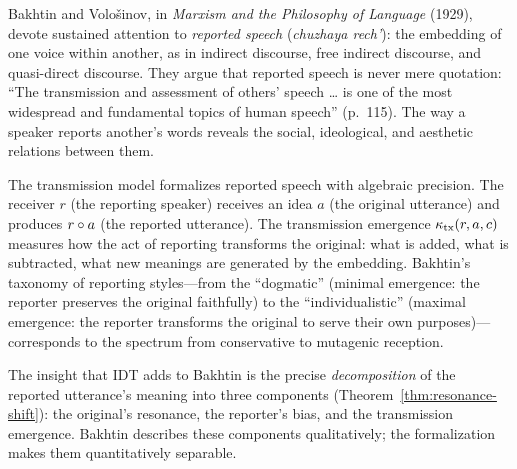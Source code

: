 \begin{interpretation}\label{interp:ch7:bakhtin_reported_speech}
Bakhtin and Volo\v{s}inov, in \emph{Marxism and the Philosophy of
Language} (1929), devote sustained attention to \emph{reported speech}
(\emph{chuzhaya rech'}): the embedding of one voice within another, as in
indirect discourse, free indirect discourse, and quasi-direct discourse.
They argue that reported speech is never mere quotation: ``The
transmission and assessment of others' speech \ldots{} is one of the most
widespread and fundamental topics of human speech'' (p.~115). The way a
speaker reports another's words reveals the social, ideological, and
aesthetic relations between them.

The transmission model formalizes reported speech with algebraic precision.
The receiver $r$ (the reporting speaker) receives an idea $a$ (the
original utterance) and produces $r \circ a$ (the reported utterance).
The transmission emergence $\kappa_{\text{tx}}(r, a, c)$ measures how
the act of reporting transforms the original: what is added, what is
subtracted, what new meanings are generated by the embedding. Bakhtin's
taxonomy of reporting styles---from the ``dogmatic'' (minimal emergence:
the reporter preserves the original faithfully) to the ``individualistic''
(maximal emergence: the reporter transforms the original to serve their
own purposes)---corresponds to the spectrum from conservative to mutagenic
reception.

The insight that IDT adds to Bakhtin is the precise \emph{decomposition}
of the reported utterance's meaning into three components
(Theorem~\ref{thm:resonance-shift}): the original's resonance, the
reporter's bias, and the transmission emergence. Bakhtin describes these
components qualitatively; the formalization makes them quantitatively
separable.
\end{interpretation}


